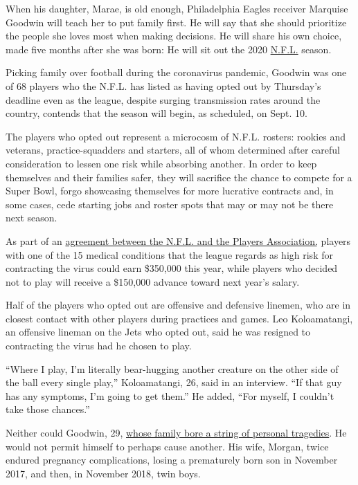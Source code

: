 When his daughter, Marae, is old enough, Philadelphia Eagles receiver
Marquise Goodwin will teach her to put family first. He will say that
she should prioritize the people she loves most when making decisions.
He will share his own choice, made five months after she was born: He
will sit out the 2020
\href{https://www.nytimes3xbfgragh.onion/2020/08/27/us/politics/lou-holtz-rnc-speech.html}{N.F.L.}
season.

Picking family over football during the coronavirus pandemic, Goodwin
was one of 68 players who the N.F.L. has listed as having opted out by
Thursday's deadline even as the league, despite surging transmission
rates around the country, contends that the season will begin, as
scheduled, on Sept. 10.

The players who opted out represent a microcosm of N.F.L. rosters:
rookies and veterans, practice-squadders and starters, all of whom
determined after careful consideration to lessen one risk while
absorbing another. In order to keep themselves and their families safer,
they will sacrifice the chance to compete for a Super Bowl, forgo
showcasing themselves for more lucrative contracts and, in some cases,
cede starting jobs and roster spots that may or may not be there next
season.

As part of an
\href{https://www.nytimes3xbfgragh.onion/2020/07/24/sports/football/nfl-players-regular-season-start.html}{agreement
between the N.F.L. and the Players Association,} players with one of the
15 medical conditions that the league regards as high risk for
contracting the virus could earn \$350,000 this year, while players who
decided not to play will receive a \$150,000 advance toward next year's
salary.

Half of the players who opted out are offensive and defensive linemen,
who are in closest contact with other players during practices and
games. Leo Koloamatangi, an offensive lineman on the Jets who opted out,
said he was resigned to contracting the virus had he chosen to play.

``Where I play, I'm literally bear-hugging another creature on the other
side of the ball every single play,'' Koloamatangi, 26, said in an
interview. ``If that guy has any symptoms, I'm going to get them.'' He
added, ``For myself, I couldn't take those chances.''

Neither could Goodwin, 29,
\href{https://www.espn.com/nfl/story/_/id/29301718/philadelphia-eagles-receiver-marquise-goodwin-wife-morgan-persevere-pain-promise-family}{whose
family bore a string of personal tragedies}. He would not permit himself
to perhaps cause another. His wife, Morgan, twice endured pregnancy
complications, losing a prematurely born son in November 2017, and then,
in November 2018, twin boys.

